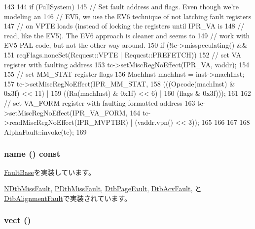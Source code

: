 \begin{DoxyCode}
143 {
144     if (FullSystem) {
145         // Set fault address and flags.  Even though we're modeling an
146         // EV5, we use the EV6 technique of not latching fault registers
147         // on VPTE loads (instead of locking the registers until IPR_VA is
148         // read, like the EV5).  The EV6 approach is cleaner and seems to
149         // work with EV5 PAL code, but not the other way around.
150         if (!tc->misspeculating() &&
151             reqFlags.noneSet(Request::VPTE | Request::PREFETCH)) {
152             // set VA register with faulting address
153             tc->setMiscRegNoEffect(IPR_VA, vaddr);
154 
155             // set MM_STAT register flags
156             MachInst machInst = inst->machInst;
157             tc->setMiscRegNoEffect(IPR_MM_STAT,
158                 (((Opcode(machInst) & 0x3f) << 11) |
159                  ((Ra(machInst) & 0x1f) << 6) |
160                  (flags & 0x3f)));
161 
162             // set VA_FORM register with faulting formatted address
163             tc->setMiscRegNoEffect(IPR_VA_FORM,
164                 tc->readMiscRegNoEffect(IPR_MVPTBR) | (vaddr.vpn() << 3));
165         }
166     }
167 
168     AlphaFault::invoke(tc);
169 }
\end{DoxyCode}
\hypertarget{classAlphaISA_1_1DtbFault_a09ac100f5ad40cf1726c4e60925c2522}{
\subsubsection[{name}]{ name () const}}
\label{classAlphaISA_1_1DtbFault_a09ac100f5ad40cf1726c4e60925c2522}


\hyperlink{classFaultBase_aad960357563b8b969d2dffdcc6861de7}{FaultBase}を実装しています。

\hyperlink{classAlphaISA_1_1NDtbMissFault_a73adb23259baf912a81683a9790a303f}{NDtbMissFault}, \hyperlink{classAlphaISA_1_1PDtbMissFault_a73adb23259baf912a81683a9790a303f}{PDtbMissFault}, \hyperlink{classAlphaISA_1_1DtbPageFault_a73adb23259baf912a81683a9790a303f}{DtbPageFault}, \hyperlink{classAlphaISA_1_1DtbAcvFault_a73adb23259baf912a81683a9790a303f}{DtbAcvFault}, と \hyperlink{classAlphaISA_1_1DtbAlignmentFault_a73adb23259baf912a81683a9790a303f}{DtbAlignmentFault}で実装されています。\hypertarget{classAlphaISA_1_1DtbFault_ae7a41506fab06a3c1e392f5286f14c66}{
\subsubsection[{vect}]{ vect ()}}
\label{classAlphaISA_1_1DtbFault_ae7a41506fab06a3c1e392f5286f14c66}


